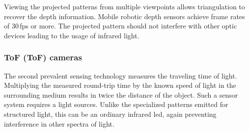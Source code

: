 Viewing the projected patterns from multiple viewpoints allows triangulation to recover the depth information.
Mobile robotic depth sensors achieve frame rates of 30\,\acrshort{fps} or more.
The projected pattern should not interfere with other optic devices leading to the usage of infrared light.

\subsubsection{\acrlong{ToF} (\acrshort{ToF}) cameras}

The second prevalent sensing technology measures the traveling time of light\cite[p. 27-41]{hansard_springer2012}.
Multiplying the measured round-trip time by the known speed of light in the surrounding medium results in twice the distance of the object.
Such a sensor system requires a light sources.
Unlike the specialized patterns emitted for structured light, this can be an ordinary infrared \acrshort{led}, again preventing interference in other spectra of light.
